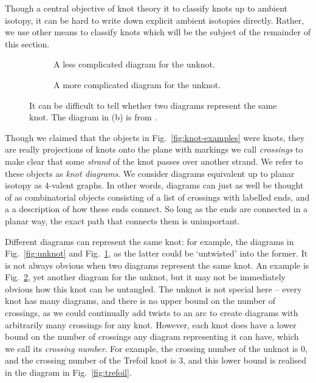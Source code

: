 \documentclass[12pt]{report}
\theoremstyle{upright}
\begin{document}
Though a central objective of knot theory it to classify knots up to ambient isotopy, it can be hard to write down explicit ambient isotopies directly. Rather, we use other means to classify knots which will be the subject of the remainder of this section.

\begin{figure}[hbt]
	\centering
	\hspace*{\fill}
	\begin{subfigure}[b]{0.35 \textwidth}
		\centering
		\def\svgscale{0.2}
		
		\caption{A less complicated diagram for the unknot.}
		\label{fig:unknot-twisted}
	\end{subfigure}
	\hspace*{\fill}
	\begin{subfigure}[b]{0.35 \textwidth}
		\centering
		\def\svgscale{0.2}
		
		\caption{A more complicated diagram for the unknot.}
		\label{fig:unknot-goertiz}
	\end{subfigure}
	\hspace*{\fill}
	\caption{It can be difficult to tell whether two diagrams represent the same knot. The diagram in (b) is from \cite{notes-on-knot-theory}.}
	\label{fig:more-unknots}
\end{figure}

Though we claimed that the objects in Fig.~\ref{fig:knot-examples} were knots, they are really projections of knots onto the plane with markings we call \textit{crossings} to make clear that some \textit{strand} of the knot passes over another strand. We refer to these objects as \textit{knot diagrams}. We consider diagrams equivalent up to planar isotopy as $4$-valent graphs. In other words, diagrams can just as well be thought of as combinatorial objects consisting of a list of crossings with labelled ends, and a a description of how these ends connect. So long as the ends are connected in a planar way, the exact path that connects them is unimportant.

Different diagrams can represent the same knot: for example, the diagrams in Fig.~\ref{fig:unknot} and Fig.~\ref{fig:unknot-twisted}, as the latter could be `untwisted' into the former. It is not always obvious when two diagrams represent the same knot. An example is Fig.~\ref{fig:unknot-goertiz}, yet another diagram for the unknot, but it may not be immediately obvious how this knot can be untangled. The unknot is not special here -- every knot has many diagrams, and there is no upper bound on the number of crossings, as we could continually add twists to an arc to create diagrams with arbitrarily many crossings for any knot. However, each knot does have a lower bound on the number of crossings any diagram representing it can have, which we call its \textit{crossing number}. For example, the crossing number of the unknot is $0$, and the crossing number of the Trefoil knot is $3$, and this lower bound is realised in the diagram in Fig.~\ref{fig:trefoil}.
\end{document}
